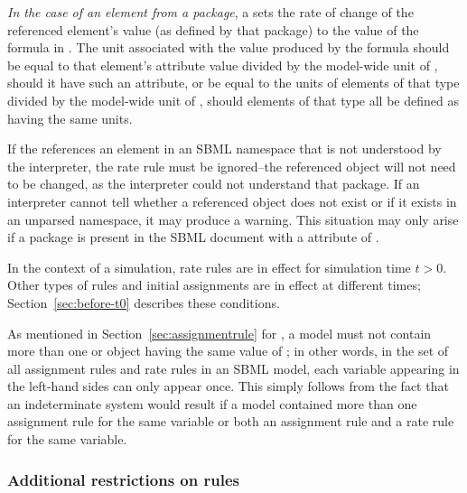 \begin{itemize}
\begin{blockChanged}
\item \emph{In the case of an element from a package}, a \RateRule sets the rate of change of the referenced element's value (as defined by that package) to the value of the formula in .  The unit associated with the value produced by the formula should be equal to that element's  attribute value divided by the model-wide unit of , should it have such an attribute, or be equal to the units of elements of that type divided by the model-wide unit of , should elements of that type all be defined as having the same units.
\end{blockChanged}

\end{itemize}

\begin{blockChanged}
If the  references an element in an SBML namespace that is not
  understood by the interpreter, the rate rule must be ignored--the 
  referenced object will not need to be changed, as the interpreter could not
  understand that package.  If an interpreter cannot tell whether 
  a referenced object does not exist or if it exists in an unparsed namespace,
  it may produce a warning.  This situation may only arise if a package is present in the SBML document with a  attribute of .
\end{blockChanged}


In the context of a simulation, rate rules are in effect for
simulation time $t > 0$.  Other types of rules and initial
assignments are in effect at different times;
Section~\ref{sec:before-t0} describes these conditions.

As mentioned in Section~\ref{sec:assignmentrule} for
\AssignmentRule, a model must not contain more than one \RateRule
or \AssignmentRule object having the same value of
; in other words, in the set of all assignment
rules and rate rules in an SBML model, each variable appearing in
the left-hand sides can only appear once.  This simply follows
from the fact that an indeterminate system would result if a model
contained more than one assignment rule for the same variable or
both an assignment rule and a rate rule for the same variable.


\subsubsection{Additional restrictions on rules}
\label{sec:ruleconstraints}

